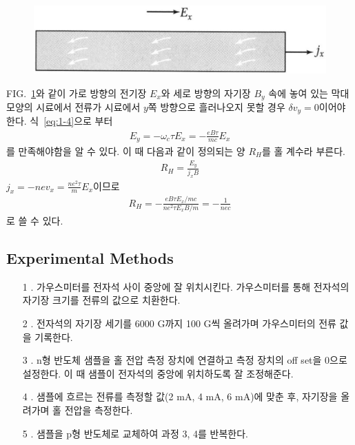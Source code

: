 \documentclass[aps,reprint,superscriptaddress,10pt]{revtex4-2}
\begin{document}
\begin{figure}[htbp]
  \centering
  \includegraphics[scale = 0.4]{1-2.png}
  \caption{}
  \label{fig:1-2}
\end{figure}

FIG.~\ref{fig:1-2}와 같이 가로 방향의 전기장 $E_x$와 세로 방향의 자기장 $B_y$ 속에 놓여 있는
막대 모양의 시료에서 전류가 시료에서 $y$쪽 방향으로 흘러나오지 못할 경우 $\delta v_y=0$이어야
한다. 식~\eqref{eq:1-4}으로 부터
\begin{align}
  E_y = -\omega_c \tau E_x = -\frac{eB\tau}{mc}E_x
\end{align}
를 만족해야함을 알 수 있다. 이 때 다음과 같이 정의되는 양 $R_H$를 홀 계수라 부른다.
\begin{align}
  R_H = \frac{E_y}{j_xB}
\end{align}
$j_x = -nev_x=\frac{ne^2\tau}{m}E_x$이므로
\begin{align}
  R_H = -\frac{eB\tau E_x/mc}{ne^2\tau E_xB/m}=-\frac{1}{nec}
\end{align}
로 쓸 수 있다.



\subsection{Experimental Methods}
\begin{itemize}
  \item[1 .] 가우스미터를 전자석 사이 중앙에 잘 위치시킨다.
  가우스미터를 통해 전자석의 자기장 크기를 전류의 값으로 치환한다.
  \item[2 .] 전자석의 자기장 세기를 6000 G까지 100 G씩 올려가며 가우스미터의 
  전류 값을 기록한다.
  \item[3 .] n형 반도체 샘플을 홀 전압 측정 장치에 연결하고 측정 장치의
  off set을 0으로 설정한다. 이 때 샘플이 전자석의 중앙에 위치하도록 잘 조정해준다. 
  \item[4 .] 샘플에 흐르는 전류를 측정할 값(2 mA, 4 mA, 6 mA)에 맞춘 후, 자기장을
  올려가며 홀 전압을 측정한다.
  \item[5 .] 샘플을 p형 반도체로 교체하여 과정 3, 4를 반복한다.
\end{itemize}

\nocite{*} 





\vfill
\end{document}
